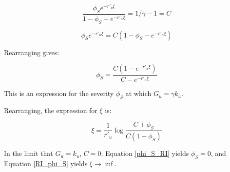 \documentclass{article}
\begin{document}
\begin{equation}
 \frac{ \phi_S  e^{-r'_u \xi}}{1- \phi_S - e^{-r'_u \xi}} =  1/\gamma  - 1 = C
\end{equation}

\begin{equation}
{ \phi_S  e^{-r'_u \xi}} = C ({1- \phi_S - e^{-r'_u \xi}} )
\end{equation}

Rearranging gives:

\begin{equation}
 \phi_S   =  \frac{C(1 - e^{-r'_u \xi})}{C  - e^{-r'_u \xi}}
 \label{phi_S_RI}
 \end{equation}

This is an expression for the severity $ \phi_S $ at which $G_u = \gamma k_u$.

Rearranging, the expression for $\xi$ is:


\begin{equation}
\xi   =  \frac{1}{r'_u}\log \frac{C  +\phi_S } {C(1 - \phi_S)}
 \label{RI_phi_S}
 \end{equation}

In the limit that  $G_u = k_u$, $C=0$;
 Equation \ref{phi_S_RI} yields $\phi_S = 0$,  and Equation \ref{RI_phi_S} yields $\xi \rightarrow \inf$.
\end{document}
